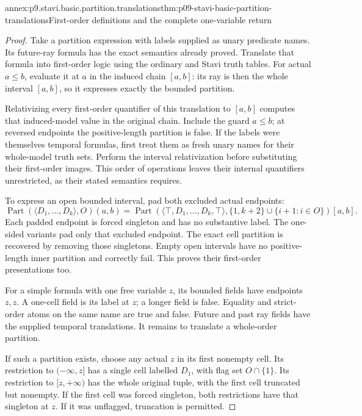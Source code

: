 \begin{annexitem}{annex:p9.stavi.basic.partition.translations}{thm:p09-stavi-basic-partition-translations}{First-order definitions and the complete one-variable return}
\begin{proof}
Take a partition expression with labels supplied as
unary predicate names. Its future-ray formula has
the exact semantics already proved. Translate
that formula into first-order logic using the
ordinary and Stavi truth tables. For actual
\(a\leq b\), evaluate it at \(a\) in the
induced chain \([a,b]\): its ray is then
the whole interval \([a,b]\), so it expresses
exactly the bounded partition.

Relativizing every first-order quantifier of
this translation to \([a,b]\) computes that
induced-model value in the original chain.
Include the guard \(a\leq b\); at reversed
endpoints the positive-length partition is
false. If the labels were themselves
temporal formulas, first treat them as
fresh unary names for their whole-model
truth sets. Perform the interval
relativization before substituting
their first-order images. This order
of operations leaves their internal
quantifiers unrestricted, as their
stated semantics requires.

To express an open bounded interval,
pad both excluded actual endpoints:
\[
 \operatorname{Part}(\langle D_1,\ldots,D_k\rangle,O)(a,b)
 =
 \operatorname{Part}(\langle\top,D_1,\ldots,D_k,\top\rangle,
       \{1,k+2\}\cup\{i+1:i\in O\})[a,b].
\]
Each padded endpoint is forced
singleton and has no substantive
label. The one-sided variants
pad only that excluded endpoint.
The exact cell partition is
recovered by removing those
singletons. Empty open intervals
have no positive-length inner
partition and correctly fail.
This proves their first-order
presentations too.

For a simple formula with one
free variable \(z\), its
bounded fields have endpoints
\(z,z\). A one-cell field
is its label at \(z\);
a longer field is false.
Equality and strict-order
atoms on the same name
are true and false.
Future and past ray fields
have the supplied temporal
translations. It remains
to translate a whole-order
partition.

If such a partition exists,
choose any actual \(z\)
in its first nonempty cell.
Its restriction to
\((-\infty,z]\) has a
single cell labelled
\(D_1\), with flag set
\(O\cap\{1\}\).
Its restriction to
\([z,+\infty)\) has the
whole original tuple,
with the first cell
truncated but nonempty.
If the first cell
was forced singleton,
both restrictions have
that singleton at \(z\).
If it was unflagged,
truncation is permitted.


\end{proof}
\end{annexitem}
